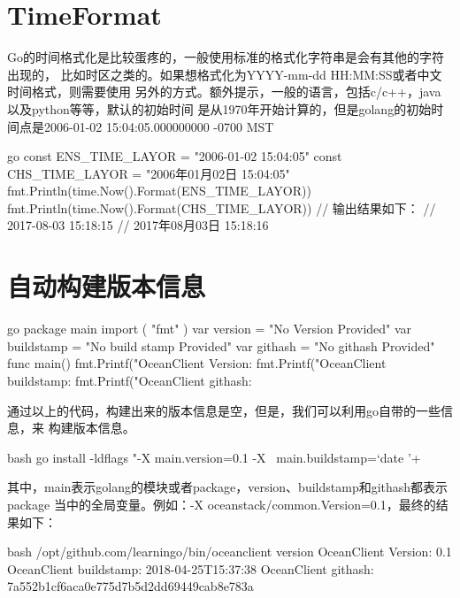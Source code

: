\section{TimeFormat}
Go的时间格式化是比较蛋疼的，一般使用标准的格式化字符串是会有其他的字符出现的，
比如时区之类的。如果想格式化为YYYY-mm-dd HH:MM:SS或者中文时间格式，则需要使用
另外的方式。额外提示，一般的语言，包括c/c++，java以及python等等，默认的初始时间
是从1970年开始计算的，但是golang的初始时间点是2006-01-02 15:04:05.000000000 -0700 MST
\begin{code-block}{go}
const ENS_TIME_LAYOR = "2006-01-02 15:04:05"
const CHS_TIME_LAYOR = "2006年01月02日 15:04:05"
fmt.Println(time.Now().Format(ENS_TIME_LAYOR))
fmt.Println(time.Now().Format(CHS_TIME_LAYOR))
// 输出结果如下：
// 2017-08-03 15:18:15
// 2017年08月03日 15:18:16
\end{code-block}

\section{自动构建版本信息}
\begin{code-block}{go}
package main
import (
    "fmt"
)
var version = "No Version Provided"
var buildstamp = "No build stamp Provided"
var githash = "No githash Provided"
func main() {
    fmt.Printf("OceanClient Version: %
    fmt.Printf("OceanClient buildstamp: %
    fmt.Printf("OceanClient githash: %
}
\end{code-block}

通过以上的代码，构建出来的版本信息是空，但是，我们可以利用go自带的一些信息，来
构建版本信息。
\begin{code-block}{bash}
go install -ldflags "-X main.version=0.1 -X \
    main.buildstamp=`date '+%
\end{code-block}
其中，main表示golang的模块或者package，version、buildstamp和githash都表示package
当中的全局变量。例如：-X oceanstack/common.Version=0.1，最终的结果如下：
\begin{code-block}{bash}
/opt/github.com/learningo/bin/oceanclient version
OceanClient Version: 0.1
OceanClient buildstamp: 2018-04-25T15:37:38
OceanClient githash: 7a552b1cf6aca0e775d7b5d2dd69449cab8e783a
\end{code-block}

